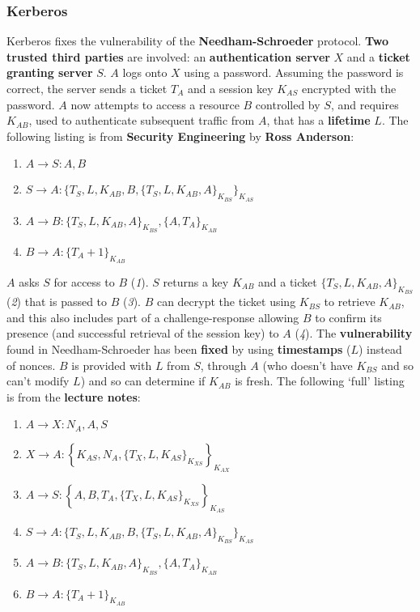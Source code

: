 \documentclass{article}
\begin{document}
\subsubsection{Kerberos}
Kerberos fixes the vulnerability of the \textbf{Needham-Schroeder} protocol. \textbf{Two trusted third parties} are involved: an \textbf{authentication server} $ X $ and a \textbf{ticket granting server} $ S $. $ A $ logs onto $ X $ using a password. Assuming the password is correct, the server sends a ticket $ T_{A} $ and a session key $ K_{AS} $ encrypted with the password. $ A $ now attempts to access a resource $ B $ controlled by $ S $, and requires $ K_{AB} $, used to authenticate subsequent traffic from $ A $, that has a \textbf{lifetime} $ L $. The following listing is from \textbf{Security Engineering} by \textbf{Ross Anderson}:
\begin{enumerate}
	\item $ A \rightarrow S : A, B $
	\item $ S \rightarrow A : \{ T_{S}, L, K_{AB}, B, \{ T_{S}, L, K_{AB}, A \}_{K_{BS}} \}_{K_{AS}} $
	\item $ A \rightarrow B : \{ T_{S}, L, K_{AB}, A \}_{K_{BS}}, \{ A, T_{A} \}_{K_{AB}} $
	\item $ B \rightarrow A : \{ T_{A} + 1 \}_{K_{AB}} $
\end{enumerate}
$ A $ asks $ S $ for access to $ B $ (\textit{1}). $ S $ returns  a key $ K_{AB} $ and a ticket $ \{ T_{S}, L, K_{AB}, A \}_{K_{BS}} $ (\textit{2}) that is passed to $ B $ (\textit{3}). $ B $ can decrypt the ticket using $ K_{BS} $ to retrieve $ K_{AB} $, and this also includes part of a challenge-response allowing $ B $ to confirm its presence (and successful retrieval of the session key) to $ A $ (\textit{4}). The \textbf{vulnerability} found in Needham-Schroeder has been \textbf{fixed} by using \textbf{timestamps} ($ L $) instead of nonces. $ B $ is provided with $ L $ from $ S $, through $ A $ (who doesn't have $ K_{BS} $ and so can't modify $ L $) and so can determine if $ K_{AB} $ is fresh. The following `full' listing is from the \textbf{lecture notes}:
\begin{enumerate}
	\item $ A \rightarrow X : N_{A}, A, S $
	\item $ X \rightarrow A : \left\lbrace K_{AS}, N_{A}, \{ T_{X}, L, K_{AS} \}_{K_{XS}} \right\rbrace_{K_{AX}} $
	\item $ A \rightarrow S : \left\lbrace A, B, T_{A}, \{ T_{X}, L, K_{AS} \}_{K_{XS}} \right\rbrace_{K_{AS}} $
	\item $ S \rightarrow A : \{ T_{S}, L, K_{AB}, B, \{ T_{S}, L, K_{AB}, A \}_{K_{BS}} \}_{K_{AS}} $
	\item $ A \rightarrow B : \{ T_{S}, L, K_{AB}, A \}_{K_{BS}}, \{ A, T_{A} \}_{K_{AB}} $
	\item $ B \rightarrow A : \{ T_{A} + 1 \}_{K_{AB}} $
\end{enumerate}
\end{document}
